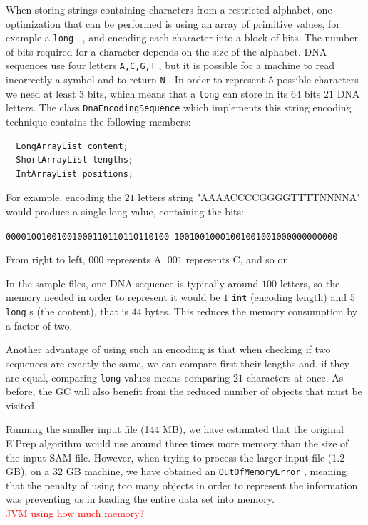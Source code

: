 \documentclass[a4paper,twoside]{article}
\begin{document}
When storing strings containing characters from a restricted alphabet, one optimization that can be performed is using an array of primitive values, for example a {\texttt{long} []}, and encoding each character into a block of bits.
The number of bits required for a character depends on the size of the alphabet.
DNA sequences use four letters {\texttt{A,C,G,T} }, but it is possible for a machine to read incorrectly a symbol and to return {\texttt{N} }.
In order to represent $5$ possible characters we need at least $3$ bits,
which means that a {\texttt{long} } can store in its $64$ bits $21$ DNA letters.
The class {\texttt{DnaEncodingSequence} } which implements this string encoding technique contains the following members:
\begin{verbatim}
  LongArrayList content;
  ShortArrayList lengths;      
  IntArrayList positions;     
\end{verbatim}
For example, encoding the $21$ letters string "AAAACCCCGGGGTTTTNNNNA" would produce a single long value, containing the bits:\\
{\texttt{00001001001001000110110110110100
10010010001001001001000000000000}

}

From right to left, $000$ represents A, $001$ represents C, and so on.

In the sample files, one DNA sequence is typically around $100$ letters, so the memory needed in order to represent it would be $1$ {\texttt{int} } (encoding length) and $5$ {\texttt{long} }s (the content), that is $44$ bytes.
This reduces the memory consumption by a factor of two.

Another advantage of using such an encoding is that when checking if two sequences are exactly the same, we can compare first their lengths and, if they are equal, comparing {\texttt{long} } values means comparing $21$ characters at once.
As before, the GC will also benefit from the reduced number of objects that must be visited.




Running the smaller input file (144 MB), we have estimated that the original ElPrep algorithm would use around three times more memory than the size of the input SAM file.
However, when trying to process the larger input file (1.2 GB), on a 32 GB machine, we have obtained an {\texttt{OutOfMemoryError} }, meaning that the penalty of using too many objects in order to represent the information was preventing us in loading the entire data set into memory.
\\ \textcolor{red}{JVM using how much memory?}
\end{document}
